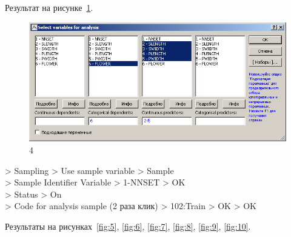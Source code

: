 Результат на рисунке~\ref{fig:4}.

\begin{figure}[!h]
  \centering

  \includegraphics[width=12cm]
  {inc/ex_4.PNG}

  \caption{4}

  \label{fig:4}
\end{figure}

> Sampling > Use sample variable > Sample \\
> Sample Identifier Variable > 1-NNSET > OK \\
> Status > On \\
> Code for analysis sample (2 раза клик) > 102:Train > OK > OK

Результаты на рисунках~\ref{fig:5}, \ref{fig:6}, \ref{fig:7},
\ref{fig:8}, \ref{fig:9}, \ref{fig:10}.

